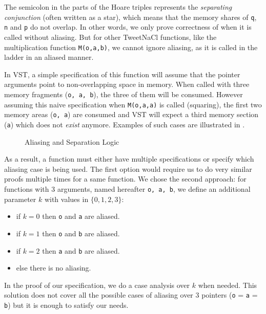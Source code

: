 
The semicolon in the  parts of the Hoare triples represents the \emph{separating conjunction} (often written as a star), which means that
the memory shares of \texttt{q}, \texttt{n} and \texttt{p} do not overlap.
In other words,
we only prove correctness of  when it is called without aliasing.
But for other TweetNaCl functions, like the multiplication function \texttt{M(o,a,b)}, we cannot ignore aliasing, as it is called in the ladder in an aliased manner.

In VST, a simple specification of this function will assume that the pointer arguments
point to non-overlapping space in memory.
When called with three memory fragments (\texttt{o, a, b}),
the three of them will be consumed. However assuming this naive specification
when \texttt{M(o,a,a)} is called (squaring), the first two memory areas (\texttt{o, a})
are consumed and VST will expect a third memory section (\texttt{a}) which does not \emph{exist} anymore.
Examples of such cases are illustrated in .
\begin{figure}[h]%
      \centering%
      \caption{Aliasing and Separation Logic}%
      \label{tikz:MemSame}%
\end{figure}
As a result, a function must either have multiple specifications or specify which
aliasing case is being used.
The first option would require us to do very similar proofs multiple times for a same function.
We chose the second approach: for functions with 3 arguments, named hereafter \texttt{o, a, b},
we define an additional parameter $k$ with values in $\{0,1,2,3\}$:
\begin{itemize}
      \item if $k=0$ then \texttt{o} and \texttt{a} are aliased.
      \item if $k=1$ then \texttt{o} and \texttt{b} are aliased.
      \item if $k=2$ then \texttt{a} and \texttt{b} are aliased.
      \item else there is no aliasing.
\end{itemize}
In the proof of our specification, we do a case analysis over $k$ when needed.
This solution does not cover all the possible cases of aliasing over 3 pointers
(\eg \texttt{o} = \texttt{a} = \texttt{b}) but it is enough to satisfy our needs.

